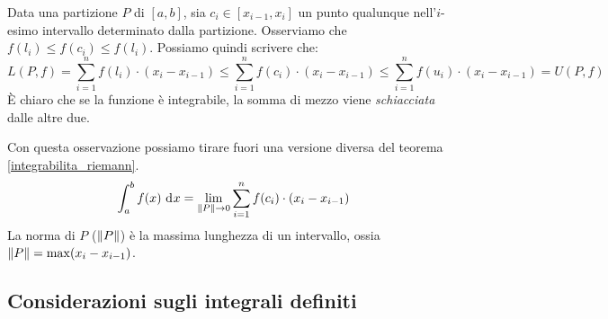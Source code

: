 \begin{oss}
Data una partizione $P$ di $[a,b]$, sia $c_i \in [x_{i-1},x_i]$ un punto qualunque nell'$i$-esimo intervallo determinato dalla partizione. Osserviamo che $f(l_i) \le f(c_i) \le f(l_i)$. Possiamo quindi scrivere che:
\[
L(P,f) = \sum_{i = 1}^{n} f(l_i) \cdot (x_{i} - x_{i - 1}) \le \sum_{i = 1}^{n} f(c_i) \cdot (x_{i} - x_{i - 1}) \le \sum_{i = 1}^{n} f(u_i) \cdot (x_{i} - x_{i - 1}) = U(P,f)
\]
\`E chiaro che se la funzione \`e integrabile, la somma di mezzo viene \emph{schiacciata} dalle altre due.
\end{oss}

Con questa osservazione possiamo tirare fuori una versione diversa del teorema \ref{integrabilita_riemann}.
\[
\int_{a}^{b} f(x) \dx = \lim_{\norm{P} \to 0} \sum_{i = 1}^{n} f(c_i) \cdot (x_i - x_{i - 1})
\]
La norma di $P$ ($\left\lVert{P}\right\rVert$) \`e la massima lunghezza di un intervallo, ossia $\left\lVert{P}\right\rVert = \max(x_i - x_{i-1})$.



\subsection{Considerazioni sugli integrali definiti}

